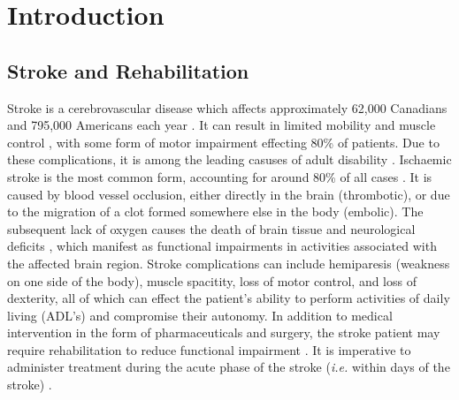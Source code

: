\documentclass[12pt]{report}
\begin{document}
	
	
\tableofcontents
\listoffigures
\listoftables

\chapter{Introduction}


\section{Stroke and Rehabilitation}

Stroke is a cerebrovascular disease which affects approximately 62,000 Canadians and 795,000 Americans each year \cite{Benjamin2018,Hebert2016}. It can result in limited mobility and muscle control \cite{Langhorne2009}, with some form of motor impairment effecting 80\% of patients. Due to these complications, it is among the leading casuses of adult disability \cite{Ewart2003}. Ischaemic stroke is the most common form, accounting for around 80\% of all cases \cite{Rey2008}. It is caused by blood vessel occlusion, either directly in the brain (thrombotic), or due to the migration of a clot formed somewhere else in the body (embolic). The subsequent lack of oxygen causes the death of brain tissue and neurological deficits \cite{Prabhakaran2015}, which manifest as functional impairments in activities associated with the affected brain region. Stroke complications can include hemiparesis (weakness on one side of the body), muscle spacitity, loss of motor control, and loss of dexterity, all of which can effect the patient's ability to perform activities of daily living (ADL's) and compromise their autonomy. In addition to medical intervention in the form of pharmaceuticals and surgery, the stroke patient may require rehabilitation to reduce functional impairment \cite{Stroke}. It is imperative to administer treatment during the acute phase of the stroke (\textit{i.e.} within days of the stroke) \cite{Prabhakaran2015}.

\end{document}
